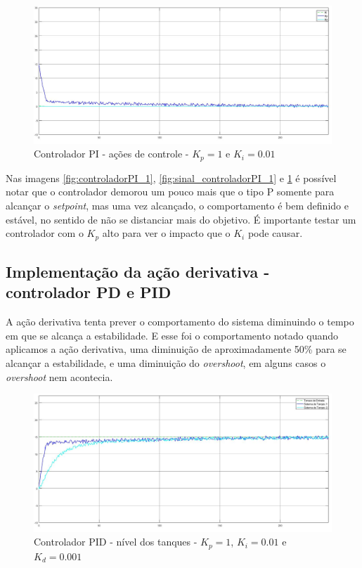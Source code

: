 \documentclass[
	12pt,				%
	openany,			%
	oneside,			%
	a4paper,			%
	english,			%
	french,				%
	spanish,			%
	brazil,				%
	]{abntex2}
\begin{document}
{\begin{figure}[h]
	\centering
	\includegraphics[scale=0.30]{1 - PI acoes_controle.jpg}
	\caption{Controlador PI - ações de controle - $K_p = 1$ e $K_i = 0.01$}
	\label{fig:acao_controladorPI_1}
\end{figure}


\clearpage

Nas imagens \ref{fig:controladorPI_1}, \ref{fig:sinal_controladorPI_1} e \ref{fig:acao_controladorPI_1} é possível notar que o controlador demorou um pouco mais que o tipo P somente para alcançar o \textit{setpoint}, mas uma vez alcançado, o comportamento é bem definido e estável, no sentido de não se distanciar mais do objetivo. É importante testar um controlador com o $K_p$ alto para ver o impacto que o $K_i$ pode causar.

\subsection{Implementação da ação derivativa - controlador PD e PID}

A ação derivativa tenta prever o comportamento do sistema diminuindo o tempo em que se alcança a estabilidade. E esse foi o comportamento notado quando aplicamos a ação derivativa, uma diminuição de aproximadamente 50\% para se alcançar a estabilidade, e uma diminuição do \textit{overshoot}, em alguns casos o \textit{overshoot} nem acontecia.

\begin{figure}[h]
	\centering
	\includegraphics[scale=0.30]{4 - nivel_ PDI_1kp_001ki_0001kd.jpg}
	\caption{Controlador PID - nível dos tanques - $K_p = 1$, $K_i = 0.01$ e $K_d=0.001$}
	\label{fig:controladorPID_1}
\end{figure}

}
\end{document}
